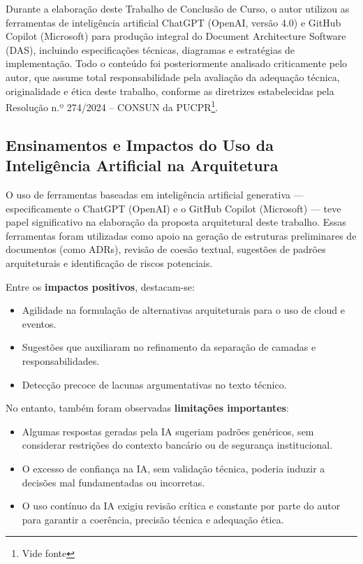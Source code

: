 Durante a elaboração deste Trabalho de Conclusão de Curso, o autor utilizou as ferramentas de inteligência artificial ChatGPT (OpenAI, versão 4.0) e GitHub Copilot (Microsoft) para produção integral do Document Architecture Software (DAS), incluindo especificações técnicas, diagramas e estratégias de implementação. Todo o conteúdo foi posteriormente analisado criticamente pelo autor, que assume total responsabilidade pela avaliação da adequação técnica, originalidade e ética deste trabalho, conforme as diretrizes estabelecidas pela Resolução n.º 274/2024 – CONSUN da PUCPR\footnote{Vide fonte }.

\subsection{Ensinamentos e Impactos do Uso da Inteligência Artificial na Arquitetura}

O uso de ferramentas baseadas em inteligência artificial generativa — especificamente o ChatGPT (OpenAI) e o GitHub Copilot (Microsoft) — teve papel significativo na elaboração da proposta arquitetural deste trabalho. Essas ferramentas foram utilizadas como apoio na geração de estruturas preliminares de documentos (como ADRs), revisão de coesão textual, sugestões de padrões arquiteturais e identificação de riscos potenciais.

Entre os \textbf{impactos positivos}, destacam-se:
\begin{itemize}
	\item Agilidade na formulação de alternativas arquiteturais para o uso de cloud e eventos.
	\item Sugestões que auxiliaram no refinamento da separação de camadas e responsabilidades.
	\item Detecção precoce de lacunas argumentativas no texto técnico.
\end{itemize}

No entanto, também foram observadas \textbf{limitações importantes}:
\begin{itemize}
	\item Algumas respostas geradas pela IA sugeriam padrões genéricos, sem considerar restrições do contexto bancário ou de segurança institucional.
	\item O excesso de confiança na IA, sem validação técnica, poderia induzir a decisões mal fundamentadas ou incorretas.
	\item O uso contínuo da IA exigiu revisão crítica e constante por parte do autor para garantir a coerência, precisão técnica e adequação ética.
\end{itemize}

